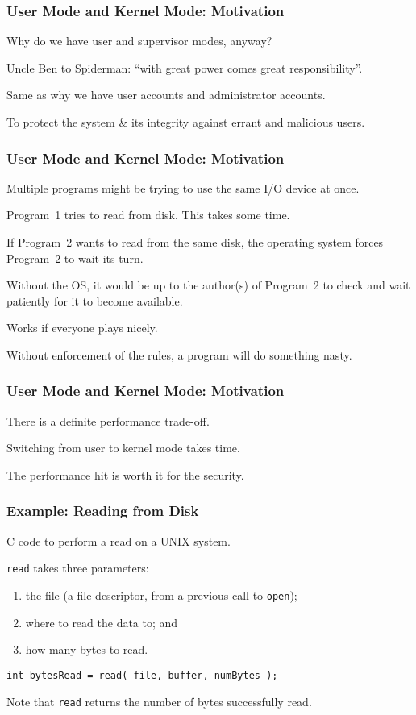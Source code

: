 \begin{frame}
\frametitle{User Mode and Kernel Mode: Motivation}

Why do we have user and supervisor modes, anyway? 

Uncle Ben to Spiderman: ``with great power comes great responsibility''. 

Same as why we have user accounts and administrator accounts. 

To protect the system \& its integrity against errant and malicious users.


\end{frame}

\begin{frame}
\frametitle{User Mode and Kernel Mode: Motivation}

Multiple programs might be trying to use the same I/O device at once.

Program~1 tries to read from disk. This takes some time.

If Program~2 wants to read from the same disk, the operating system forces Program~2 to wait its turn.

Without the OS, it would be up to the author(s) of Program~2 to check and wait patiently for it to become available. 

Works if everyone plays nicely.

Without enforcement of the rules, a program will do something nasty.

\end{frame}

\begin{frame}
\frametitle{User Mode and Kernel Mode: Motivation}

There is a definite performance trade-off.

Switching from user to kernel mode takes time.

The performance hit is worth it for the security.

\end{frame}

\begin{frame}
\frametitle{Example: Reading from Disk}
C code to perform a read on a UNIX system.

\texttt{read} takes three parameters: 
\begin{enumerate}
	\item the file (a file descriptor, from a previous call 
to \texttt{open}); 
	\item where to read the data to; and
	\item how many bytes to read.
\end{enumerate} 

\texttt{int bytesRead = read( file, buffer, numBytes );}

Note that \texttt{read} returns the number of bytes successfully read.

\end{frame}


